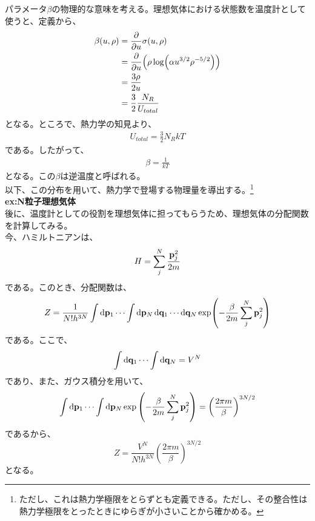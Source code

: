\documentclass[a4paper,11pt]{jsarticle}
\numberwithin{equation}{section}
\begin{document}
パラメータ$\beta$の物理的な意味を考える。理想気体における状態数を温度計として使うと、定義から、
\begin{align}
  \beta(u,\rho) &= \pdv{u}\sigma(u,\rho)\\
  &= \pdv{u}(\rho \log (\alpha u^{3/2}\rho^{-5/2}))\\
  &= \frac{3\rho}{2u}\\
  &= \frac{3}{2}\frac{N_R}{U_{total}}
\end{align}
となる。ところで、熱力学の知見より、
\begin{align}
  U_{total} = \frac{3}{2}N_R kT
\end{align}
である。したがって、
\begin{align}
  \beta = \frac{1}{kT}
\end{align}
となる。この$\beta$は逆温度と呼ばれる。\\
 
以下、この分布を用いて、熱力学で登場する物理量を導出する。\footnote{ただし、これは熱力学極限をとらずとも定義できる。ただし、その整合性は熱力学極限をとったときにゆらぎが小さいことから確かめる。}\\

\textbf{ex:N粒子理想気体}\\
後に、温度計としての役割を理想気体に担ってもらうため、理想気体の分配関数を計算してみる。\\
今、ハミルトニアンは、
\begin{equation}
    H = \sum_{j}^{N} \frac{\vb{p}_j^2}{2m}
\end{equation}
である。このとき、分配関数は、
\begin{equation}
    Z = \frac{1}{N!h^{3N}} \int \dd{\vb{p}_1} \cdots \int \dd{\vb{p}_N} \dd{\vb{q}_1} \cdots \dd{\vb{q}_N} \exp(-\frac{\beta}{2m} \sum_{j}^{N} \vb{p}_j^2)
\end{equation}
である。ここで、
\begin{equation}
    \int \dd{\vb{q}_1} \cdots \int \dd{\vb{q}_N} = V^N
\end{equation}
であり、また、ガウス積分を用いて、
\begin{equation}
    \int \dd{\vb{p}_1} \cdots \int \dd{\vb{p}_N} \exp\left(-\frac{\beta}{2m} \sum_{j}^{N} \vb{p}_j^2\right) = \left( \frac{2\pi m}{\beta} \right)^{3N/2}
\end{equation}
であるから、
\begin{equation}
    Z = \frac{V^N}{N!h^{3N}} \left( \frac{2\pi m}{\beta} \right)^{3N/2} \label{eq:idealz}
\end{equation}
となる。
\end{document}
